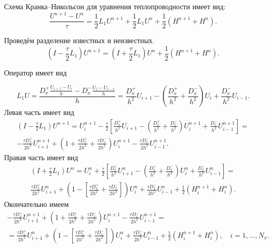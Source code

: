 \documentclass[a4paper,12pt]{article}
\begin{document}
Схема Кранка--Никольсон для уравнения теплопроводности имеет вид:
\begin{equation}
  \frac{U^{n+1} - U^n}{\tau} = \frac{1}{2} L_1 U^{n+1}  + \frac{1}{2} L_1 U^n +
    \frac{1}{2} \left( H^{n+1} + H^{n} \right).
\end{equation}

Проведём разделение известных и неизвестных.
\begin{equation*}
  \left( I - \frac{\tau}{2} L_1 \right) U^{n+1} =
    \left( I + \frac{\tau}{2} L_1 \right) U^n +
    \frac{1}{2} \left( H^{n+1} + H^{n} \right).
\end{equation*}

Оператор имеет вид

\begin{equation*}
  L_1 U = \frac{D^+_x \frac{U_{i+1} - U_{i}}{h} - D^-_x\frac{U_{i} - U_{i-1}}{h}}{h} = \frac{D^+_x}{h^2}U_{i+1} - \left( \frac{D^+_x}{h^2} + \frac{D^-_x}{h^2} \right)U_{i} +  \frac{D^-_x}{h^2}U_{i-1}.
\end{equation*}
Левая часть имеет вид
\begin{multline*}
  \left( I - \frac{\tau}{2} L_1 \right) U^{n+1} = U^{n+1}_i - \frac{\tau}{2} \left[ \frac{D^+_x}{h^2}U_{i+1} - \left( \frac{D^+_x}{h^2} + \frac{D^-_x}{h^2} \right) U^{n+1}_{i} +  \frac{D^-_x}{h^2}U^{n+1}_{i-1} \right] = \\
  - \frac{\tau D^+_x}{2h^2}U^{n+1}_{i+1} + \left(1 + \frac{\tau D^+_x}{2 h^2} + \frac{\tau D^-_x}{2 h^2} \right) U^{n+1}_{i} - \frac{\tau D^-_x}{2h^2}U^{n+1}_{i-1}.
\end{multline*}
Правая часть имеет вид
\begin{multline*}
  \left( I + \frac{\tau}{2} L_1 \right) U^{n} =
    U^{n}_i + \frac{\tau}{2} \left[ \frac{D^+_x}{h^2}U^{n}_{i+1} -
    \left( \frac{D^+_x}{h^2} + \frac{D^-_x}{h^2} \right) U^{n}_{i} +
    \frac{D^-_x}{h^2}U^{n}_{i-1} \right] = \\
  \frac{\tau D^+_x}{2h^2}U^{n}_{i+1} + \left(1 - \left[\frac{\tau D^+_x}{2 h^2} +
    \frac{\tau D^-_x}{2 h^2} \right] \right) U^{n}_{i} +
    \frac{\tau D^-_x}{2h^2}U^{n}_{i-1} + \frac{1}{2} \left( H^{n+1}_i + H^{n}_i \right).
\end{multline*}
Окончательно имеем
\begin{multline*}
  - \frac{\tau D^+_x}{2h^2}U^{n+1}_{i+1} + \left(1 + \frac{\tau D^+_x}{2 h^2} + \frac{\tau D^-_x}{2 h^2} \right) U^{n+1}_{i} - \frac{\tau D^-_x}{2h^2}U^{n+1}_{i-1}= \\
  = \frac{\tau D^+_x}{2h^2}U^{n}_{i+1} + \left(1 - \left[ \frac{\tau D^+_x}{2 h^2} + \frac{\tau D^-_x}{2 h^2} \right] \right) U^{n}_{i} + \frac{\tau D^-_x}{2h^2}U^{n}_{i-1} + \frac{1}{2} \left( H^{n+1}_i + H^{n}_i \right), \quad i = 1, \ldots, N_x.
\end{multline*}
\end{document}
